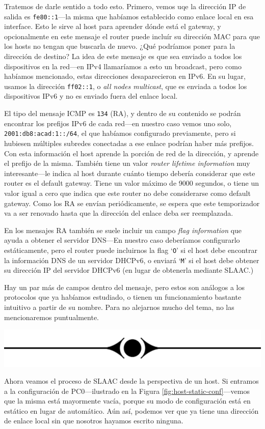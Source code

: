 \documentclass[a4paper,10pt]{corsage}
\newcommand{\ipaddress}[1]{\texttt{#1}}
\newcommand{\devname}[1]{\textsc{#1}}
\newcommand{\rest}{%
	\par\vspace{0.5\baselineskip}%
	\centerline{\includegraphics[height=\baselineskip]{rest}}%
	\vspace{\parskip}\vspace*{-\parskip}%
	\ignorespacesafterend\par\noindent\aftergroup%
}
\begin{document}
	Tratemos de darle sentido a todo esto.  Primero, vemos uqe la dirección IP de salida es \ipaddress{fe80::1}---la misma que habíamos establecido como enlace local en esa interface.  Esto le sirve al host para aprender dónde está el gateway, y opcionalmente en este mensaje el router puede incluír su dirección MAC para que los hosts no tengan que buscarla de nuevo.  ¿Qué podríamos poner para la dirección de destino?  La idea de este mensaje es que sea enviado a todos los dispositivos en la red---en IPv4 llamaríamos a esto un broadcast, pero como habíamos mencionado, estas direcciones desaparecieron en IPv6.  En su lugar, usamos la dirección \ipaddress{ff02::1}, o \textit{all nodes multicast}, que es enviada a todos los dispositivos IPv6 y no es enviado fuera del enlace local.

	El tipo del mensaje ICMP es \texttt{134} (RA), y dentro de su contenido se podrán encontrar los prefijos IPv6 de cada red---en nuestro caso vemos uno solo, \ipaddress{2001:db8:acad:1::/64}, el que habíamos configurado previamente, pero si hubiesen múltiples subredes conectadas a ese enlace podrían haber más prefijos.  Con esta información el host aprende la porción de red de la dirección, y aprende el prefijo de la misma.  También tiene un valor \textit{router lifetime information} muy interesante---le indica al host durante cuánto tiempo debería considerar que este router es el default gateway.  Tiene un valor máximo de 9000 segundos, o tiene un valor igual a cero que indica que este router no debe considerarse como default gateway.  Como los RA se envían periódicamente, se espera que este temporizador va a ser renovado hasta que la dirección del enlace deba ser reemplazada.

	En los mensajes RA también se suele incluir un campo \textit{flag information} que ayuda a obtener el servidor DNS---En nuestro caso deberíamos configurarlo estáticamente, pero el router puede incluirnos la flag `\texttt{O}' si el host debe encontrar la información DNS de un servidor DHCPv6, o enviará `\texttt{M}' si el host debe obtener su dirección IP del servidor DHCPv6 (en lugar de obtenerla mediante SLAAC.)

	Hay un par más de campos dentro del mensaje, pero estos son análogos a los protocolos que ya habíamos estudiado, o tienen un funcionamiento bastante intuitivo a partir de su nombre.  Para no alejarnos mucho del tema, no las mencionaremos puntualmente.

	\rest

	Ahora veamos el proceso de SLAAC desde la perspectiva de un host.  Si entramos a la configuración de \devname{PC0}---ilustrado en la Figura \ref{fig:host-static-conf}---vemos que la misma está mayormente vacía, porque su modo de configuración está en estático en lugar de automático.  Aún así, podemos ver que ya tiene una dirección de enlace local sin que nosotros hayamos escrito ninguna.
\end{document}

